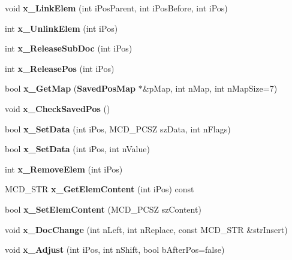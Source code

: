 \begin{CompactItemize}
void {\bf x\_\-LinkElem} (int iPosParent, int iPosBefore, int iPos)
\item 
int {\bf x\_\-UnlinkElem} (int iPos)
\item 
int {\bf x\_\-ReleaseSubDoc} (int iPos)
\item 
int {\bf x\_\-ReleasePos} (int iPos)
\item 
bool {\bf x\_\-GetMap} ({\bf SavedPosMap} $\ast$\&pMap, int nMap, int nMapSize=7)
\item 
void {\bf x\_\-CheckSavedPos} ()
\item 
bool {\bf x\_\-SetData} (int iPos, MCD\_\-PCSZ szData, int nFlags)
\item 
bool {\bf x\_\-SetData} (int iPos, int nValue)
\item 
int {\bf x\_\-RemoveElem} (int iPos)
\item 
MCD\_\-STR {\bf x\_\-GetElemContent} (int iPos) const 
\item 
bool {\bf x\_\-SetElemContent} (MCD\_\-PCSZ szContent)
\item 
void {\bf x\_\-DocChange} (int nLeft, int nReplace, const MCD\_\-STR \&strInsert)
\item 
void {\bf x\_\-Adjust} (int iPos, int nShift, bool bAfterPos=false)
\end{CompactItemize}
